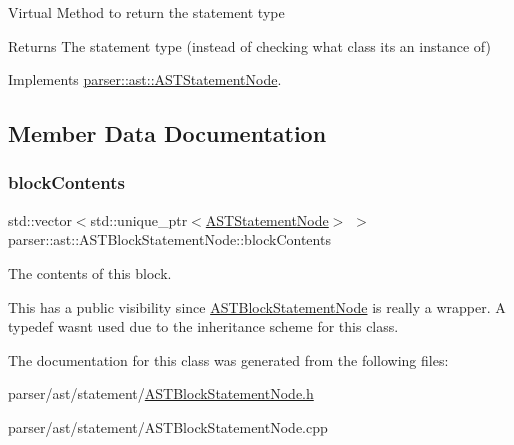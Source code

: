 Virtual Method to return the statement type \begin{DoxyReturn}{Returns}
The statement type (instead of checking what class it\textquotesingle{}s an instance of) 
\end{DoxyReturn}


Implements \hyperlink{classparser_1_1ast_1_1ASTStatementNode_ac381d35d12f774a1bab0e209c5bfec1f}{parser\+::ast\+::\+A\+S\+T\+Statement\+Node}.



\subsection{Member Data Documentation}
\mbox{\label{classparser_1_1ast_1_1ASTBlockStatementNode_abbd8aa518677035cba32a20a4d7135ac}} 
\subsubsection{\texorpdfstring{block\+Contents}{blockContents}}
{\footnotesize\ttfamily std\+::vector$<$std\+::unique\+\_\+ptr$<$\hyperlink{classparser_1_1ast_1_1ASTStatementNode}{A\+S\+T\+Statement\+Node}$>$ $>$ parser\+::ast\+::\+A\+S\+T\+Block\+Statement\+Node\+::block\+Contents}



The contents of this block. 

This has a public visibility since \hyperlink{classparser_1_1ast_1_1ASTBlockStatementNode}{A\+S\+T\+Block\+Statement\+Node} is really a wrapper. A {\ttfamily typedef} wasn\textquotesingle{}t used due to the inheritance scheme for this class. 

The documentation for this class was generated from the following files\+:\begin{DoxyCompactItemize}
\item 
parser/ast/statement/\hyperlink{ASTBlockStatementNode_8h}{A\+S\+T\+Block\+Statement\+Node.\+h}\item 
parser/ast/statement/A\+S\+T\+Block\+Statement\+Node.\+cpp\end{DoxyCompactItemize}
